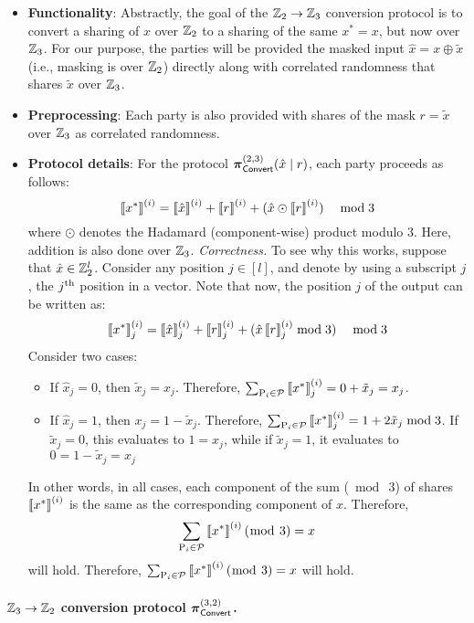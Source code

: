 \begin{itemize}
  \item \textbf{Functionality}: Abstractly, the goal of the $\mathbb{Z}_2 \to \mathbb{Z}_3$ conversion protocol is to convert a sharing of $x$ over $\mathbb{Z}_2$ to a sharing of the same $x^* = x$, but now over $\mathbb{Z}_3$. For our purpose, the parties will be provided the masked input $\hat{x} = x \oplus \tilde{x}$ (i.e., masking is over $\mathbb{Z}_2$) directly along with correlated randomness that shares $\tilde{x}$ over $\mathbb{Z}_3$.

  \item \textbf{Preprocessing}: Each party is also provided with shares of the mask $r = \tilde{x}$ over $\mathbb{Z}_3$ as correlated randomness.

  \item \textbf{Protocol details}: For the protocol $\boldsymbol{\pi}_{\textnormal{\textsf{Convert}}}^{(2,3)}(\hat{x} \mid r)$, each party proceeds as follows:
  \[
  \left\llbracket x^* \right\rrbracket^{(i)} = \left\llbracket \hat{x} \right\rrbracket^{(i)} + \left\llbracket r \right\rrbracket^{(i)} + (\hat{x} \odot \left\llbracket r \right\rrbracket^{(i)}) \quad \bmod 3
  \]
where $\odot$ denotes the Hadamard (component-wise) product modulo 3. Here, addition is also done over $\mathbb{Z}_3$.
\iffull
\noindent \textit{Correctness.} To see why this works, suppose that $\hat{x} \in \mathbb{Z}_2^l$. Consider any position $j \in [l]$, and denote by using a subscript $j$, the $j^{\textnormal{th}}$ position in a vector. Note that now, the position $j$ of the output can be written as:
\[
    \left\llbracket x^* \right\rrbracket^{(i)}_j = \left\llbracket \hat{x} \right\rrbracket^{(i)}_j + \left\llbracket r \right\rrbracket^{(i)}_j + (\hat{x}\left\llbracket r \right\rrbracket^{(i)}_j\bmod 3) \quad \bmod 3
\]
Consider two cases:
\begin{itemize}
\item If $\hat{x}_j = 0$, then $\tilde{x}_j = x_j$. Therefore, $\sum_{\textnormal{P}_i \in \mathcal{P}} \left\llbracket x^* \right\rrbracket^{(i)}_j = 0 + \tilde{x}_j = x_j$.

\item If $\hat{x}_j = 1$, then $x_j = 1 - \tilde{x}_j$. Therefore, $\sum_{\textnormal{P}_i \in \mathcal{P}} \left\llbracket x^* \right\rrbracket^{(i)}_j = 1 + 2\tilde{x}_j \bmod 3$. If $\tilde{x}_j = 0$, this evaluates to $1 = x_j$, while if $\tilde{x}_j = 1$, it evaluates to $0 = 1 - \tilde{x}_j = x_j$
\end{itemize}
\iffull
In other words, in all cases, each component of the sum ($\bmod~3$) of shares $\left\llbracket x^* \right\rrbracket^{(i)}$ is the same as the corresponding component of $x$.
Therefore,
\[
\sum_{\textnormal{P}_i \in \mathcal{P}} \left\llbracket x^* \right\rrbracket^{(i)} (\bmod~3) = x
\]
will hold.
\else
Therefore, $\sum_{\textnormal{P}_i \in \mathcal{P}} \left\llbracket x^* \right\rrbracket^{(i)} (\bmod~3) = x$ will hold.
\fi
\fi
\end{itemize}


\paragraph{$\mathbb{Z}_3 \to \mathbb{Z}_2$ conversion protocol $\boldsymbol{\pi}_{\textnormal{\textsf{Convert}}}^{(3,2)}$.}

